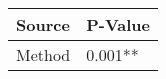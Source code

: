 
\centering
\begin{tabular}{ll}
\toprule
Source & P-Value \\
\midrule
Method & 0.001** \\
\bottomrule
\end{tabular}
